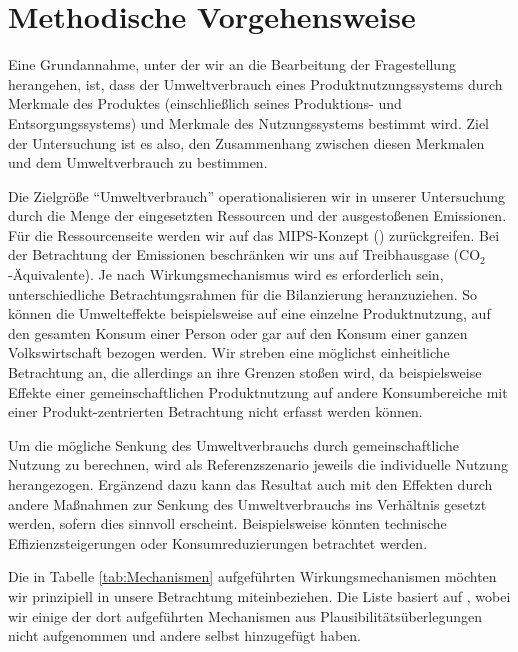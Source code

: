 \documentclass[11pt, titlepage=true]{scrartcl} %
\begin{document}
\section{Methodische Vorgehensweise}
Eine Grundannahme, unter der wir an die Bearbeitung der Fragestellung herangehen, ist, dass der Umweltverbrauch eines Produktnutzungssystems durch Merkmale des Produktes (einschließlich seines Produktions- und Entsorgungssystems) und Merkmale des Nutzungssystems bestimmt wird. Ziel der Untersuchung ist es also, den Zusammenhang zwischen diesen Merkmalen und dem Umweltverbrauch zu bestimmen.

Die Zielgröße \enquote{Umweltverbrauch} operationalisieren wir in unserer Untersuchung durch die Menge der eingesetzten Ressourcen und der ausgestoßenen Emissionen. Für die Ressourcenseite werden wir auf das MIPS-Konzept (\cite{schmidt-bleek_maia:_1998}) zurückgreifen. Bei der Betrachtung der Emissionen beschränken wir uns auf Treibhausgase (CO$_{2}$-Äquivalente). Je nach Wirkungsmechanismus wird es erforderlich sein, unterschiedliche Betrachtungsrahmen für die Bilanzierung heranzuziehen. So können die Umwelteffekte beispielsweise auf eine einzelne Produktnutzung, auf den gesamten Konsum einer Person oder gar auf den Konsum einer ganzen Volkswirtschaft bezogen werden. Wir streben eine möglichst einheitliche Betrachtung an, die allerdings an ihre Grenzen stoßen wird, da beispielsweise Effekte einer gemeinschaftlichen Produktnutzung auf andere Konsumbereiche mit einer Produkt-zentrierten Betrachtung nicht erfasst werden können.

Um die mögliche Senkung des Umweltverbrauchs durch gemeinschaftliche Nutzung zu berechnen, wird als Referenzszenario jeweils die individuelle Nutzung herangezogen. Ergänzend dazu kann das Resultat auch mit den Effekten durch andere Maßnahmen zur Senkung des Umweltverbrauchs ins Verhältnis gesetzt werden, sofern dies sinnvoll erscheint. Beispielsweise könnten technische Effizienzsteigerungen oder Konsumreduzierungen betrachtet werden.

Die in Tabelle \ref{tab:Mechanismen} aufgeführten Wirkungsmechanismen möchten wir prinzipiell in unsere Betrachtung miteinbeziehen. Die Liste basiert auf \cite{scholl_marketing_2009}, wobei wir einige der dort aufgeführten Mechanismen aus Plausibilitätsüberlegungen nicht aufgenommen und andere selbst hinzugefügt haben.
\end{document}
